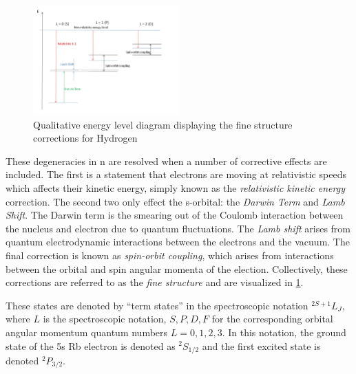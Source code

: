 \documentclass[12pt]{article}
\begin{document}
	\begin{figure}
		\includegraphics[width=0.5\textwidth]{Fine_Structure/HydrogenFineStructure1.jpg}
		\caption{Qualitative energy level diagram displaying the fine structure corrections for Hydrogen}
		\label{HydrogenFine}
	\end{figure}


	These degeneracies in n are resolved when a number of corrective effects are included. The first is a statement that electrons are moving at relativistic speeds which affects their kinetic energy, simply known as the \emph{relativistic kinetic energy} correction. The second two only effect the s-orbital: the \emph{Darwin Term} and \emph{Lamb Shift}. The Darwin term is the smearing out of the Coulomb interaction between the nucleus and electron due to quantum fluctuations. The \emph{Lamb shift} arises from quantum electrodynamic interactions between the electrons and the vacuum. The final correction is known as \emph{spin-orbit coupling}, which arises from interactions between the orbital and spin angular momenta of the election. Collectively, these corrections are referred to as the \emph{fine structure} and are visualized in \cref{HydrogenFine}.
	
	These states are denoted by ``term states'' in the spectroscopic notation $^{2S+1}L_J$, where $L$ is the spectroscopic notation, $S,P,D,F$ for the corresponding orbital angular momentum quantum numbers $L=0,1,2,3$. In this notation, the ground state of the 5s Rb electron is denoted as $^2S_{1/2}$ and the first excited state is denoted $^2P_{3/2}$.
	
\end{document}
